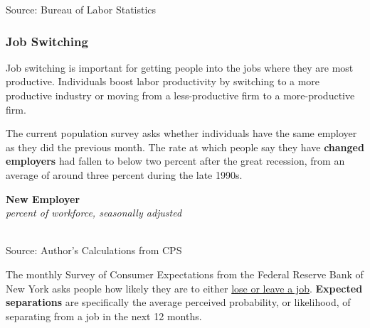 \documentclass{report}
\makeatletter
\newcommand{\tbllink}[1]{\href{https://raw.githubusercontent.com/bdecon/US-chartbook/master/chartbook/data/#1}{\faTable}}
\newcommand*\short[1]{\expandafter\@gobbletwo\number\numexpr#1\relax}
\newcommand{\dateaxisticks}{
		date coordinates in=x, axis line style={draw=none},
		xmax={2023-10-01},
		max space between ticks=40,	    
		xtick={{1990-01-01}, {1992-01-01}, {1994-01-01}, 
			{1996-01-01}, {1998-01-01}, {2000-01-01}, 
			{2002-01-01}, {2004-01-01}, {2006-01-01},
			{2008-01-01}, {2010-01-01}, {2012-01-01}, {2014-01-01},
		    {2016-01-01}, {2018-01-01}, {2020-01-01}, {2022-01-01}, 
		    {2024-01-01}, {2026-01-01}},
		minor xtick={{1989-01-01}, {1991-01-01}, {1993-01-01},
			{1995-01-01}, {1997-01-01}, {1999-01-01}, 
			{2001-01-01}, {2003-01-01}, {2005-01-01}, {2007-01-01},
		    {2009-01-01}, {2011-01-01}, {2013-01-01}, {2015-01-01},
		    {2017-01-01}, {2019-01-01}, {2021-01-01}, {2023-01-01}, 
		    {2025-01-01}, {2027-01-01}},
		enlarge y limits={0.06}, enlarge x limits={0.01},
		}
\newcommand{\stdline}[4]{\addplot[very thick, no markers, color=#1] 
		table [x=#2, y=#3, col sep=comma] {#4};	}
\newcommand{\thickline}[4]{\addplot[ultra thick, no markers, color=#1] 
		table [x=#2, y=#3, col sep=comma] {#4};	}
\newcommand{\rebars}{
		\fill[color=black!10] (axis cs:{2007-12-01},\pgfkeysvalueof{/pgfplots/ymin}) rectangle 
			(axis cs:{2009-07-01}, \pgfkeysvalueof{/pgfplots/ymax});
		\fill[color=black!10] (axis cs:{2001-03-01},\pgfkeysvalueof{/pgfplots/ymin}) rectangle 
			(axis cs:{2001-11-01}, \pgfkeysvalueof{/pgfplots/ymax});
		\fill[color=black!10] (axis cs:{2020-02-01},\pgfkeysvalueof{/pgfplots/ymin}) rectangle 
			(axis cs:{2020-05-01}, \pgfkeysvalueof{/pgfplots/ymax});}
\makeatother
\begin{document}
{\begin{minipage}{0.42\textwidth}
\footnotesize{Source: Bureau of Labor Statistics} \hfill \tbllink{openings_ind.csv}
\end{minipage}
\newpage
\begin{minipage}{0.76\textwidth}  
\subsubsection*{Job Switching}
\small Job switching is important for getting people into the jobs where they are most productive. Individuals boost labor productivity by switching to a more productive industry or moving from a less-productive firm to a more-productive firm. 

The current population survey asks whether individuals have the same employer as they did the previous month. The rate at which people say they have \textbf{changed employers} had fallen to below two percent after the great recession, from an average of around three percent during the late 1990s. 

 
\vspace{1mm}

\normalsize \textbf{New Employer}\\
\footnotesize{\textit{percent of workforce, seasonally adjusted}}\\
\hspace*{-2mm} \\
\footnotesize{Source: Author's Calculations from CPS} \hfill \tbllink{jobswitch.csv} 
\vspace{5mm}

\small The monthly Survey of Consumer Expectations from the Federal Reserve Bank of New York asks people how likely they are to either \href{https://www.newyorkfed.org/microeconomics/sce#/jobsep-1}{lose or leave a job}. \textbf{Expected separations} are specifically the average perceived probability, or likelihood, of separating from a job in the next 12 months. 


\end{minipage}}
\end{document}
